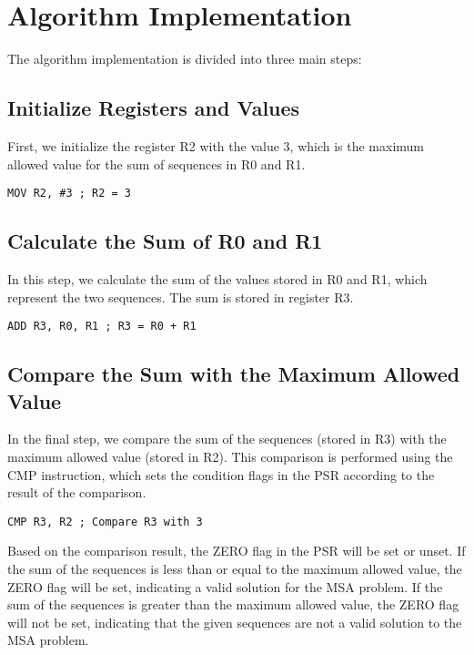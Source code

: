 \section{Algorithm Implementation}

The algorithm implementation is divided into three main steps:

\subsection{Initialize Registers and Values}

First, we initialize the register R2 with the value 3, which is the maximum allowed value for the sum of sequences in R0 and R1.

\begin{verbatim}
MOV R2, #3 ; R2 = 3
\end{verbatim}

\subsection{Calculate the Sum of R0 and R1}

In this step, we calculate the sum of the values stored in R0 and R1, which represent the two sequences. The sum is stored in register R3.

\begin{verbatim}
ADD R3, R0, R1 ; R3 = R0 + R1
\end{verbatim}

\subsection{Compare the Sum with the Maximum Allowed Value}

In the final step, we compare the sum of the sequences (stored in R3) with the maximum allowed value (stored in R2). This comparison is performed using the CMP instruction, which sets the condition flags in the PSR according to the result of the comparison.

\begin{verbatim}
CMP R3, R2 ; Compare R3 with 3
\end{verbatim}

Based on the comparison result, the ZERO flag in the PSR will be set or unset. If the sum of the sequences is less than or equal to the maximum allowed value, the ZERO flag will be set, indicating a valid solution for the MSA problem. If the sum of the sequences is greater than the maximum allowed value, the ZERO flag will not be set, indicating that the given sequences are not a valid solution to the MSA problem.

